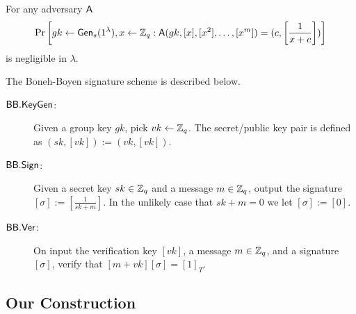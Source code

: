 \begin{definition}
For any adversary $\mathsf{A}$
$$
\Pr\left[gk\gets\mathsf{Gen}_s(1^\lambda),x\gets\mathbb{Z}_q:\mathsf{A}(gk,[x],[x^2],\ldots,[x^m])=(c,\left[\frac{1}{x+c}\right])\right]
$$
is negligible in $\lambda$.
\end{definition}

The Boneh-Boyen signature scheme is described below.

\begin{description}
\item[$\mathsf{BB}.\mathsf{KeyGen}$:] Given a group key $gk$, pick $vk\gets\mathbb{Z}_q$. The secret/public key pair is defined as $(sk,[vk]):=(vk,[vk])$.
\item[$\mathsf{BB}.\mathsf{Sign}$:] Given a secret key $sk\in\mathbb{Z}_q$ and a message $m\in\mathbb{Z}_q$, output the signature $[\sigma]:=\left[\frac{1}{sk+m}\right]$. In the unlikely case that $sk+m=0$ we let $[\sigma]:=[0]$.
\item[$\mathsf{BB}.\mathsf{Ver}$:] On input the verification key $[vk]$, a message $m\in\mathbb{Z}_q$, and a signature $[\sigma]$, verify that $[m+vk][\sigma]=[1]_T$.
\end{description} 

\subsection{Our Construction}

